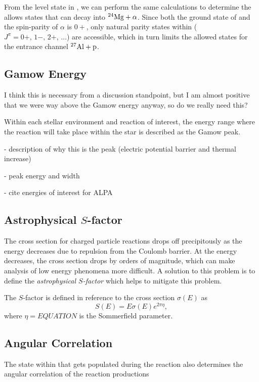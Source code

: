 From the level state in , we can perform the same calculations to
determine the allows states that can decay into ${}^{24}\textrm{Mg} + \alpha$. Since
both the ground state of  and the spin-parity of $\alpha$ is $0+$,
only natural parity states within 
($J^{\pi} = 0+,\, 1-,\, 2+,\, \ldots$) are accessible, which in turn limits the
allowed states for the entrance channel ${}^{27}\textrm{Al} + \rm{p}$.

\subsection{Gamow Energy}

I think this is necessary from a discussion standpoint, but I am almost
positive that we were way above the Gamow energy anyway, so do we really need
this?

Within each stellar environment and reaction of interest, the energy range
where the reaction will take place within the star is described as the Gamow
peak.

- description of why this is the peak (electric potential barrier and thermal increase)

- peak energy and width

- cite energies of interest for ALPA

\subsection{Astrophysical $S$-factor}

The cross section for charged particle reactions drops off precipitously as
the energy decreases due to repulsion from the Coulomb barrier. At the energy
decreases, the cross section drops by orders of magnitude, which can make
analysis of low energy phenomena more difficult. A solution to this problem is
to define the \emph{astrophysical $S$-factor} which helps to mitigate this
problem.

The $S$-factor is defined in reference to the cross section $\sigma(E)$ as
\[
    S(E) = E\sigma(E)e^{2\pi\eta},
\]
where $\eta = EQUATION$ is the Sommerfield parameter.

\subsection{Angular Correlation}

The state within  that gets populated during the reaction also
determines the angular correlation of the reaction productions

